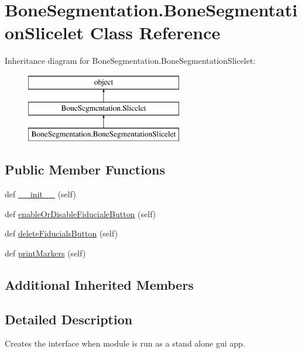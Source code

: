 \hypertarget{class_bone_segmentation_1_1_bone_segmentation_slicelet}{}\section{Bone\+Segmentation.\+Bone\+Segmentation\+Slicelet Class Reference}
\label{class_bone_segmentation_1_1_bone_segmentation_slicelet}
Inheritance diagram for Bone\+Segmentation.\+Bone\+Segmentation\+Slicelet\+:\begin{figure}[H]
\begin{center}
\leavevmode
\includegraphics[height=3.000000cm]{class_bone_segmentation_1_1_bone_segmentation_slicelet}
\end{center}
\end{figure}
\subsection*{Public Member Functions}
\begin{DoxyCompactItemize}
\item 
def \hyperlink{class_bone_segmentation_1_1_bone_segmentation_slicelet_a9f410c094d4df3646d6eccf3ba06e22e}{\+\_\+\+\_\+init\+\_\+\+\_\+} (self)
\item 
def \hyperlink{class_bone_segmentation_1_1_bone_segmentation_slicelet_aaf7d20abeae35cdff19660f1d0b2ce20}{enable\+Or\+Disable\+Fiduciale\+Button} (self)
\item 
def \hyperlink{class_bone_segmentation_1_1_bone_segmentation_slicelet_aac05ba6ae75abfd82774e805b5e3720d}{delete\+Fiducials\+Button} (self)
\item 
def \hyperlink{class_bone_segmentation_1_1_bone_segmentation_slicelet_a06dbda3177b62cf4978e1e21cc13b453}{print\+Markers} (self)
\end{DoxyCompactItemize}
\subsection*{Additional Inherited Members}


\subsection{Detailed Description}
\begin{DoxyVerb}Creates the interface when module is run as a stand alone gui app.\end{DoxyVerb}
 


